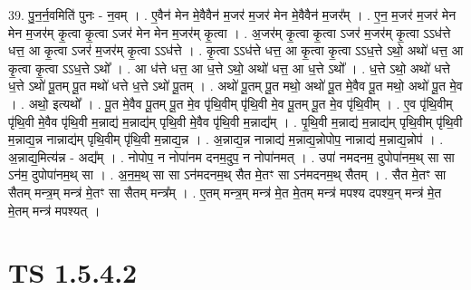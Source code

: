 \documentclass[17pt]{extarticle}
\begin{document}
39. पु॒न॒र्न॒वमिति॑ पुनः - न॒वम् । . ए॒वैन॑ मेन मे॒वैवैन॑ म॒जर॑ म॒जर॑ मेन मे॒वैवैन॑ म॒जर᳚म् । . ए॒न॒ म॒जर॑ म॒जर॑ मेन मेन म॒जर॑म् कृ॒त्वा कृ॒त्वा ऽजर॑ मेन मेन म॒जर॑म् कृ॒त्वा । . अ॒जर॑म् कृ॒त्वा कृ॒त्वा ऽजर॑ म॒जर॑म् कृ॒त्वा ऽऽध॑त्ते धत्त॒ आ कृ॒त्वा ऽजर॑ म॒जर॑म् कृ॒त्वा ऽऽध॑त्ते । . कृ॒त्वा ऽऽध॑त्ते धत्त॒ आ कृ॒त्वा कृ॒त्वा ऽऽध॒त्ते ऽथो॒ अथो॑ धत्त॒ आ कृ॒त्वा कृ॒त्वा ऽऽध॒त्ते ऽथो᳚ । . आ ध॑त्ते धत्त॒ आ ध॒त्ते ऽथो॒ अथो॑ धत्त॒ आ ध॒त्ते ऽथो᳚ । . ध॒त्ते ऽथो॒ अथो॑ धत्ते ध॒त्ते ऽथो॑ पू॒तम् पू॒त मथो॑ धत्ते ध॒त्ते ऽथो॑ पू॒तम् । . अथो॑ पू॒तम् पू॒त मथो॒ अथो॑ पू॒त मे॒वैव पू॒त मथो॒ अथो॑ पू॒त मे॒व । . अथो॒ इत्यथो᳚ । . पू॒त मे॒वैव पू॒तम् पू॒त मे॒व पृ॑थि॒वीम् पृ॑थि॒वी मे॒व पू॒तम् पू॒त मे॒व पृ॑थि॒वीम् । . ए॒व पृ॑थि॒वीम् पृ॑थि॒वी मे॒वैव पृ॑थि॒वी म॒न्नाद्य॑ म॒न्नाद्य॑म् पृथि॒वी मे॒वैव पृ॑थि॒वी म॒न्नाद्य᳚म् । . पृ॒थि॒वी म॒न्नाद्य॑ म॒न्नाद्य॑म् पृथि॒वीम् पृ॑थि॒वी म॒न्नाद्य॒न्न नान्नाद्य॑म् पृथि॒वीम् पृ॑थि॒वी म॒न्नाद्य॒न्न । . अ॒न्नाद्य॒न्न नान्नाद्य॑ म॒न्नाद्य॒न्नोपोप॒ नान्नाद्य॑ म॒न्नाद्य॒न्नोप॑ । . अ॒न्नाद्य॒मित्य॑न्न - अद्य᳚म् । . नोपोप॒ न नोपा॑नम दनम॒दुप॒ न नोपा॑नमत् । . उपा॑ नमदनम॒ दुपोपा॑नम॒थ् सा सा ऽन॑म॒ दुपोपा॑नम॒थ् सा । . अ॒न॒म॒थ् सा सा ऽन॑मदनम॒थ् सैत मे॒तꣳ सा ऽन॑मदनम॒थ् सैतम् । . सैत मे॒तꣳ सा सैतम् मन्त्र॒म् मन्त्र॑ मे॒तꣳ सा सैतम् मन्त्र᳚म् । . ए॒तम् मन्त्र॒म् मन्त्र॑ मे॒त मे॒तम् मन्त्र॑ मपश्य दपश्य॒न् मन्त्र॑ मे॒त मे॒तम् मन्त्र॑ मपश्यत् । \newline
\pagebreak
{}
\section*{ TS 1.5.4.2 }
\end{document}
